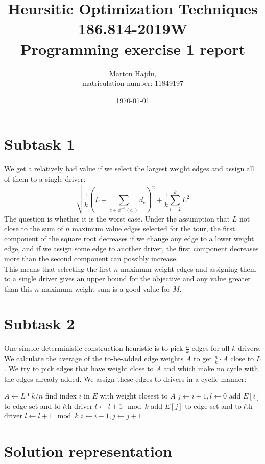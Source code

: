 \documentclass{article}
\title{Heursitic Optimization Techniques\\186.814-2019W\\Programming exercise 1 report}
\date{\today}
\author{Marton Hajdu,\\matriculation number: 11849197}
\begin{document}
\maketitle
\section*{Subtask 1}
We get a relatively bad value if we select the largest weight edges and assign all of them to a single driver:
$$\sqrt{\frac{1}{k}(L-\sum_{e\in\phi^{-1}(c_i)}{d_e})^2+\frac{1}{k}\sum_{i=2}^{k}{L^2}}$$
The question is whether it is the worst case. Under the assumption that $L$ not close to the sum of $n$ maximum value edges selected for the tour, the first component of the square root decreases if we change any edge to a lower weight edge, and if we assign some edge to another driver, the first component decreases more than the second component can possibly increase.\medskip\\
This means that selecting the first $n$ maximum weight edges and assigning them to a single driver gives an upper bound for the objective and any value greater than this $n$ maximum weight sum is a good value for $M$.
\section*{Subtask 2}
One simple deterministic construction heuristic is to pick $\frac{n}{k}$ edges for all $k$ drivers. We calculate the average of the to-be-added edge weights $A$ to get $\frac{n}{k}\cdot A$ close to $L$. We try to pick edges that have weight close to $A$ and which make no cycle with the edges already added. We assign these edges to drivers in a cyclic manner:
\begin{algorithmic}[1]
\State $A \gets L*k/n$
\State find index $i$ in $E$ with weight closest to $A$
\State $j \gets i+1, l \gets 0$
\State add $E[i]$ to edge set and to $l$th driver
\State $l \gets l + 1 \mod k$
\EndIf
{}
\State add $E[j]$ to edge set and to $l$th driver
\State $l \gets l + 1 \mod k$
\EndIf
\State $i \gets i - 1, j \gets j + 1$
\EndWhile
\EndFunction
\end{algorithmic} 
\section*{Solution representation}
\end{document}
